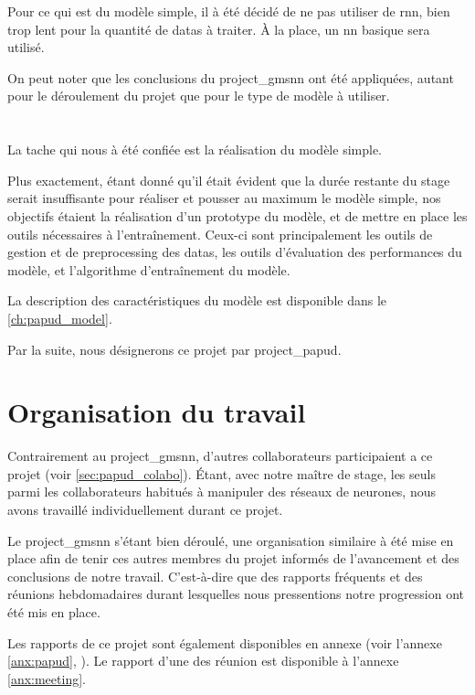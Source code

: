 Pour ce qui est du modèle simple, il à été décidé de ne pas utiliser de \gls{rnn}, bien trop lent pour la quantité de \glspl{data} à traiter. À la place, un \gls{nn} basique sera utilisé.

On peut noter que les conclusions du \gls{project_gmsnn} ont été appliquées, autant pour le déroulement du projet que pour le type de modèle à utiliser.


\section{}
La tache qui nous à été confiée est la réalisation du modèle simple.

Plus exactement, étant donné qu'il était évident que la durée restante du stage serait insuffisante pour réaliser et pousser au maximum le modèle simple, nos objectifs étaient la réalisation d'un prototype du modèle, et de mettre en place les outils nécessaires à l'entraînement.
Ceux-ci sont principalement les outils de gestion et de \gls{preprocessing} des \glspl{data}, les outils d'évaluation des performances du modèle, et l'algorithme d'entraînement du modèle.

La description des caractéristiques du modèle est disponible dans le \autoref{ch:papud_model}.

Par la suite, nous désignerons ce projet par \og \gls{project_papud}\fg{}.

\section{Organisation du travail}
Contrairement au \gls{project_gmsnn}, d'autres collaborateurs participaient a ce projet (voir \autoref{sec:papud_colabo}).
Étant, avec notre maître de stage, les seuls parmi les collaborateurs habitués à manipuler des réseaux de neurones, nous avons travaillé individuellement durant ce projet.

Le \gls{project_gmsnn} s'étant bien déroulé, une organisation similaire à été mise en place afin de tenir ces autres membres du projet informés de l'avancement et des conclusions de notre travail.
C'est-à-dire que des rapports fréquents et des réunions hebdomadaires durant lesquelles nous pressentions notre progression ont été mis en place.

Les rapports de ce projet sont également disponibles en annexe (voir l'annexe \ref{anx:papud}, ).
Le rapport d'une des réunion est disponible à l'annexe \ref{anx:meeting}. %

